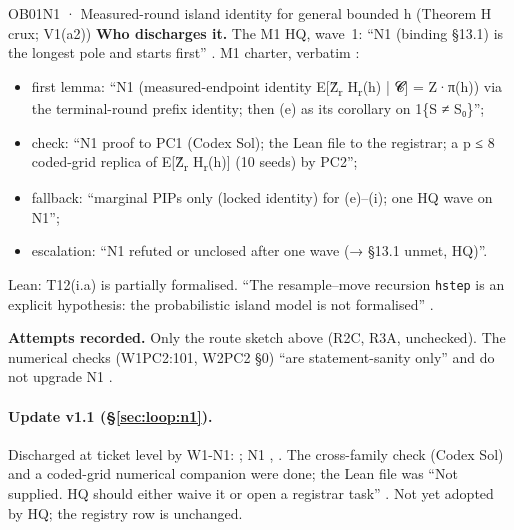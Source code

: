 \begin{card}{OB01}{N1 · Measured-round island identity for general bounded h (Theorem H crux; V1(a2))}
\textbf{Who discharges it.} The M1 HQ, wave~1: ``N1 (binding §13.1) is the longest pole and starts first'' . M1 charter, verbatim :
\begin{itemize}
\item first lemma: ``N1 (measured-endpoint identity E[Ẑ\textsubscript{r} H\textsubscript{r}(h) | 𝓒] = Z·π(h)) via the terminal-round prefix identity; then (e) as its corollary on 1\{S ≠ S₀\}'';
\item check: ``N1 proof to PC1 (Codex Sol); the Lean file to the registrar; a p ≤ 8 coded-grid replica of E[Ẑ\textsubscript{r} H\textsubscript{r}(h)] (10 seeds) by PC2'';
\item fallback: ``marginal PIPs only (locked identity) for (e)–(i); one HQ wave on N1'';
\item escalation: ``N1 refuted or unclosed after one wave (→ §13.1 unmet, HQ)''.
\end{itemize}
Lean: T12(i.a) is partially formalised. ``The resample–move recursion \texttt{hstep} is an explicit hypothesis: the probabilistic island model is not formalised'' .

\textbf{Attempts recorded.} Only the route sketch above (R2C, R3A, unchecked). The numerical checks (W1PC2:101, W2PC2 §0) ``are statement-sanity only'' and do not upgrade N1 .
\end{card}

\paragraph{Update v1.1 (\S\ref{sec:loop:n1}).} Discharged at ticket level by W1-N1: ; N1  , . The cross-family check (Codex Sol) and a coded-grid numerical companion were done; the Lean file was ``Not supplied. HQ should either waive it or open a registrar task'' . Not yet adopted by HQ; the registry row is unchanged.

